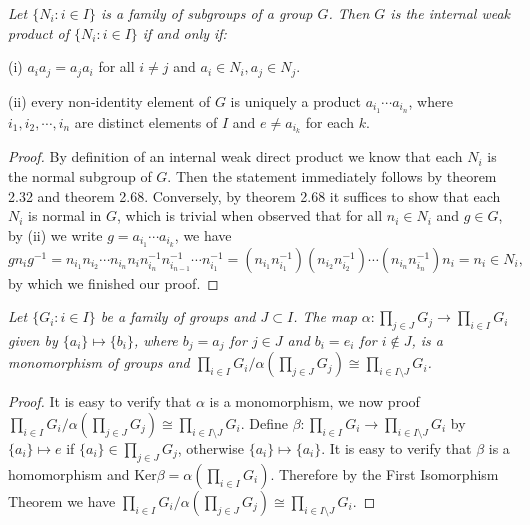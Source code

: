 \begin{problem}\em
Let $\{N_i:i\in I\}$ is a family of subgroups of a group $G$. Then $G$ is the internal weak product of $\{N_i:i\in I\}$ if and only if:\par
(i) $a_ia_j=a_ja_i$ for all $i\ne j$ and $a_i\in N_i,a_j\in N_j$.\par
(ii) every non-identity element of $G$ is uniquely a product $a_{i_1}\cdots a_{i_n}$, where $i_1,i_2,\cdots,i_n$ are distinct elements of $I$ and $e\ne a_{i_k}$ for each $k$.
\end{problem}
\begin{proof}
By definition of an internal weak direct product we know that each $N_i$ is the normal subgroup of $G$. Then the statement immediately follows by theorem 2.32 and theorem 2.68. Conversely, by theorem 2.68 it suffices to show that each $N_i$ is normal in $G$, which is trivial when observed that for all $n_i\in N_i$ and $g\in G$, by (ii) we write $g=a_{i_1}\cdots a_{i_k}$, we have 
$$
gn_ig^{-1}=n_{i_1}n_{i_2}\cdots n_{i_n}n_in_{i_n}^{-1}n_{i_{n-1}}^{-1}\cdots n_{i_1}^{-1}=\left( n_{i_1}n_{i_1}^{-1} \right) \left( n_{i_2}n_{i_2}^{-1} \right) \cdots \left( n_{i_n}n_{i_n}^{-1} \right) n_i=n_i\in N_i,
$$
by which we finished our proof.
\end{proof}
\begin{problem}\em
Let $\{G_i:i\in I\}$ be a family of groups and $J\subset I$. The map $\alpha:\prod_{j\in J}G_j\to\prod_{i\in I}G_i$ given by $\{a_i\}\mapsto\{b_i\}$, where $b_j=a_j$ for $j\in J$ and $b_i=e_i$ for $i\notin J$, is a monomorphism of groups and $\prod_{i\in I}G_i/\alpha\left(\prod_{j\in J}G_j\right)\cong\prod_{i\in I\setminus J}G_i$.
\end{problem}
\begin{proof}
It is easy to verify that $\alpha$ is a monomorphism, we now proof $\prod_{i\in I}G_i/\alpha\left(\prod_{j\in J}G_j\right)\cong\prod_{i\in I\setminus J}G_i$. Define $\beta :\prod_{i\in I}{G_i}\rightarrow \prod_{i\in I\setminus J}{G_i}$ by $\{a_i\}\mapsto e$ if $\{a_i\}\in\prod_{j\in J}G_j$, otherwise $\{a_i\}\mapsto\{a_i\}$. It is easy to verify that $\beta$ is a homomorphism and $\mathrm{Ker}\beta=\alpha\left(\prod_{i\in I}G_i\right)$. Therefore by the First Isomorphism Theorem we have $\prod_{i\in I}G_i/\alpha\left(\prod_{j\in J}G_j\right)\cong\prod_{i\in I\setminus J}G_i$.
\end{proof}
